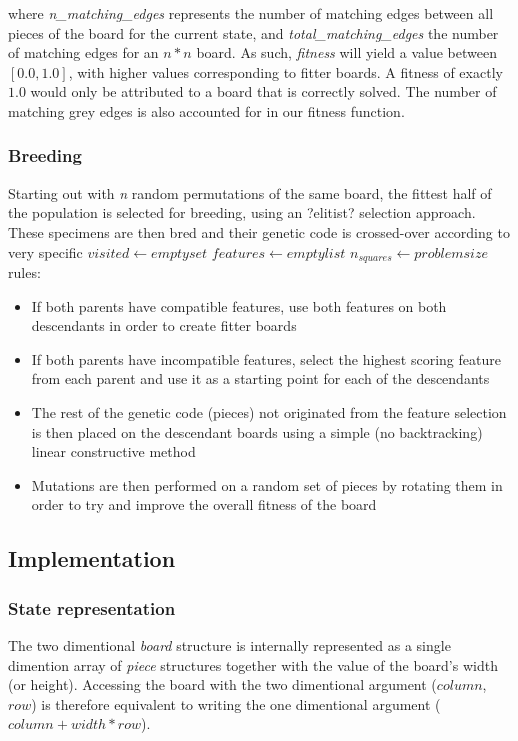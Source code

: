 \documentclass{llncs}
\begin{document}
where \textit{n\_matching\_edges} represents the number of matching edges between all pieces of the board for the current state, and \textit{total\_matching\_edges} the number of matching edges for an $n*n$ board. As such, \textit{fitness} will yield a value between $[0.0, 1.0]$, with higher values corresponding to fitter boards. A fitness of exactly $1.0$ would only be attributed to a board that is correctly solved.
The number of matching grey edges is also accounted for in our fitness function.

\subsubsection{Breeding}
Starting out with \textit{n} random permutations of the same board, the fittest half of the population is selected for breeding, using an ?elitist? selection approach. These specimens are then bred and their genetic code is crossed-over according to very specific 
	\STATE $visited \gets empty set$
	\STATE $features \gets empty list$
	\STATE $n_{squares} \gets problem size$rules:

\begin{itemize}
	\item If both parents have compatible features, use both features on both descendants in order to create fitter boards
	\item If both parents have incompatible features, select the highest scoring feature from each parent and use it as a starting point for each of the descendants
	\item The rest of the genetic code (pieces) not originated from the feature selection is then placed on the descendant boards using a simple (no backtracking) linear constructive method
	\item Mutations are then performed on a random set of pieces by rotating them in order to try and improve the overall fitness of the board
\end{itemize}

\subsection{Implementation}\label{sec:implementation}

\subsubsection{State representation}\label{sec:state_representation}

The two dimentional \textit{board} structure is internally represented as a single dimention array of \textit{piece} structures together with the value of the board's width (or height). Accessing the board with the two dimentional argument ($column$, $row$) is therefore equivalent to writing the one dimentional argument ($column + width * row$).
\end{document}
